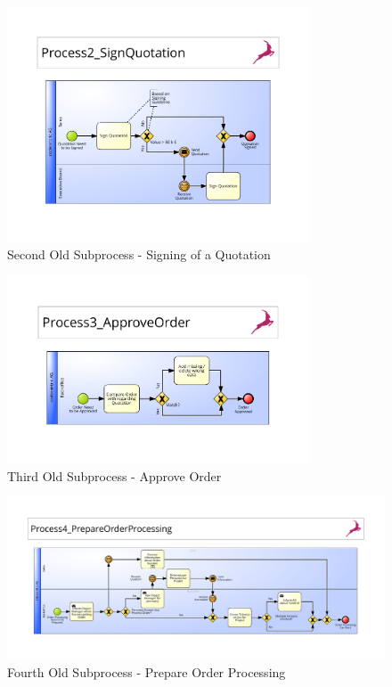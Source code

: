 \begin{figure}[h]
	\begin{center}
		\includegraphics[width=0.8\textwidth]{./appendix/pbmnOld/0-2_signQuote.pdf}
		\caption{Second Old Subprocess - Signing of a Quotation}\label{fig:0-2_sub}
	\end{center}
\end{figure}

\begin{figure}[h]
	\begin{center}
		\includegraphics[width=0.8\textwidth]{./appendix/pbmnOld/0-3_approveOrder.pdf}
		\caption{Third Old Subprocess - Approve Order}\label{fig:0-3_sub}
	\end{center}
\end{figure}

\begin{figure}[h]
	\begin{center}
		\includegraphics[width=\textheight,angle=90]{./appendix/pbmnOld/0-4_orderProcessing.pdf}
		\caption{Fourth Old Subprocess - Prepare Order Processing}\label{fig:0-4_sub}
	\end{center}
\end{figure}

